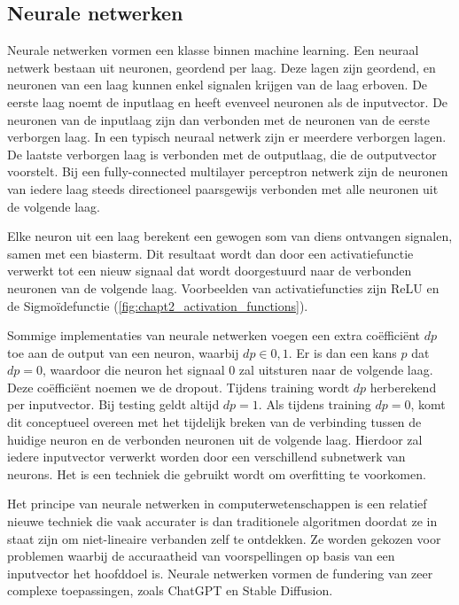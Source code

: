\subsection{Neurale netwerken}
Neurale netwerken vormen een klasse binnen machine learning. Een neuraal netwerk bestaan uit neuronen, geordend per laag. Deze lagen zijn geordend, en neuronen van een laag kunnen enkel signalen krijgen van de laag erboven. De eerste laag noemt de inputlaag en heeft evenveel neuronen als de inputvector. De neuronen van de inputlaag zijn dan verbonden met de neuronen van de eerste verborgen laag. In een typisch neuraal netwerk zijn er meerdere verborgen lagen. De laatste verborgen laag is verbonden met de outputlaag, die de outputvector voorstelt. Bij een fully-connected multilayer perceptron netwerk zijn de neuronen van iedere laag steeds directioneel paarsgewijs verbonden met alle neuronen uit de volgende laag. \cite{multilayer_perceptron_model_cursus}

Elke neuron uit een laag berekent een gewogen som van diens ontvangen signalen, samen met een biasterm. Dit resultaat wordt dan door een activatiefunctie verwerkt tot een nieuw signaal dat wordt doorgestuurd naar de verbonden neuronen van de volgende laag. Voorbeelden van activatiefuncties zijn ReLU en de Sigmoïdefunctie (\autoref{fig:chapt2_activation_functions}).


Sommige implementaties van neurale netwerken voegen een extra coëfficiënt $dp$ toe aan de output van een neuron, waarbij $dp \in {0, 1}$. Er is dan een kans $p$ dat $dp = 0$, waardoor die neuron het signaal $0$ zal uitsturen naar de volgende laag. Deze coëfficiënt noemen we de dropout. Tijdens training wordt $dp$ herberekend per inputvector. Bij testing geldt altijd $dp = 1$. \cite{nn_dropout} Als tijdens training $dp = 0$, komt dit conceptueel overeen met het tijdelijk breken van de verbinding tussen de huidige neuron en de verbonden neuronen uit de volgende laag. Hierdoor zal iedere inputvector verwerkt worden door een verschillend subnetwerk van neurons. Het is een techniek die gebruikt wordt om overfitting te voorkomen.

Het principe van neurale netwerken in computerwetenschappen is een relatief nieuwe techniek die vaak accurater is dan traditionele algoritmen doordat ze in staat zijn om niet-lineaire verbanden zelf te ontdekken. Ze worden gekozen voor problemen waarbij de accuraatheid van voorspellingen op basis van een inputvector het hoofddoel is. Neurale netwerken vormen de fundering van zeer complexe toepassingen, zoals ChatGPT en Stable Diffusion. \cite{chatgpt_voorbeeld_transformers_arno, stable_diffusion}

